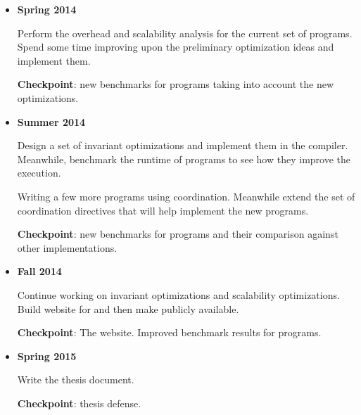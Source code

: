 \begin{itemize}
   \item \textbf{Spring 2014}
      
   Perform the overhead and scalability analysis for the current set of \lang programs.
   Spend some time improving upon the preliminary optimization ideas and implement them.

   \textbf{Checkpoint}: new benchmarks for \lang programs taking into account the new optimizations.

   \item \textbf{Summer 2014}
   
   Design a set of invariant optimizations and implement them in the compiler. Meanwhile, benchmark the runtime of programs to see how they improve the execution.

   Writing a few more programs using coordination.
   Meanwhile extend the set of coordination directives that will help implement the new programs.

   \textbf{Checkpoint}: new benchmarks for \lang programs and their comparison against other implementations.
   
   \item \textbf{Fall 2014}
   
   Continue working on invariant optimizations and scalability optimizations.
   Build website for \lang and then make \lang publicly available.
   
   \textbf{Checkpoint}: The \lang website. Improved benchmark results for \lang programs.
   
   \item \textbf{Spring 2015}
   
   Write the thesis document.
   
   \textbf{Checkpoint}: thesis defense.

\end{itemize}

